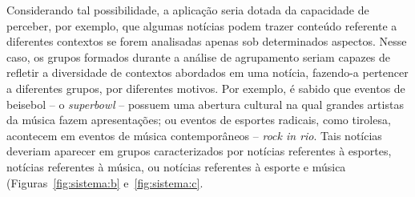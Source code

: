 \documentclass[
    12pt,                %
    oneside,            %
    a4paper,            %
    english,            %
    brazil                %
    ]{abntex2ppgsi}
\begin{document}
Considerando tal possibilidade, a aplicação seria dotada da capacidade de perceber, por exemplo, que algumas notícias podem trazer conteúdo referente a diferentes contextos se forem analisadas apenas sob determinados aspectos.
Nesse caso, os grupos formados durante a análise de agrupamento seriam capazes de refletir a diversidade de contextos abordados em uma notícia, fazendo-a pertencer a diferentes grupos, por diferentes motivos.
Por exemplo, é sabido que eventos de beisebol -- o \textit{superbowl} -- possuem uma abertura cultural na qual grandes artistas da música fazem apresentações; ou eventos de esportes radicais, como tirolesa, acontecem em eventos de música contemporâneos -- \textit{rock in rio}.
Tais notícias deveriam aparecer em grupos caracterizados por notícias referentes à esportes, notícias referentes à música, ou notícias referentes à esporte e música (Figuras~\ref{fig:sistema:b} e~\ref{fig:sistema:c}.
\end{document}
